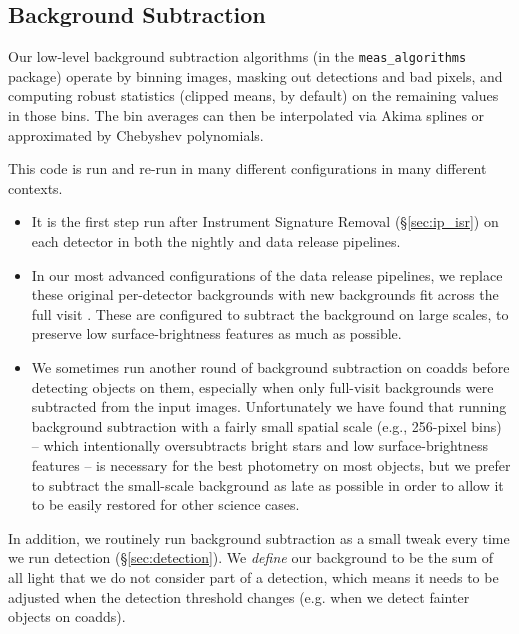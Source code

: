 \subsection{Background Subtraction}
\label{sec:backgrounds}

Our low-level background subtraction algorithms (in the \texttt{meas\_algorithms} package) operate by binning images, masking out detections and bad pixels, and computing robust statistics (clipped means, by default) on the remaining values in those bins.
The bin averages can then be interpolated via Akima splines or approximated by Chebyshev polynomials.

This code is run and re-run in many different configurations in many different contexts.

\begin{itemize}
\item It is the first step run after Instrument Signature Removal (\S\ref{sec:ip_isr}) on each detector in both the nightly and data release pipelines.
\item In our most advanced configurations of the data release pipelines, we replace these original per-detector backgrounds with new backgrounds fit across the full visit \citep{2019PASJ...71..114A}.
These are configured to subtract the background on large scales, to preserve low surface-brightness features as much as possible.
\item We sometimes run another round of background subtraction on coadds before detecting objects on them, especially when only full-visit backgrounds were subtracted from the input images.
Unfortunately we have found that running background subtraction with a fairly small spatial scale (e.g., 256-pixel bins) -- which intentionally oversubtracts bright stars and low surface-brightness features -- is necessary for the best photometry on most objects, but we prefer to subtract the small-scale background as late as possible in order to allow it to be easily restored for other science cases.
\end{itemize}

In addition, we routinely run background subtraction as a small tweak every time we run detection (\S\ref{sec:detection}).
We \emph{define} our background to be the sum of all light that we do not consider part of a detection, which means it needs to be adjusted when the detection threshold changes (e.g. when we detect fainter objects on coadds).
